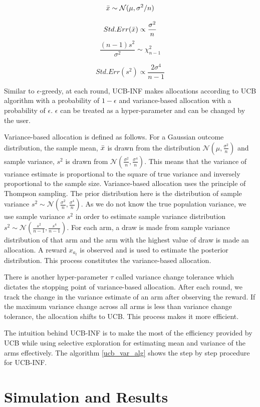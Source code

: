 \documentclass[12pt, letterpaper]{article}
\begin{document}
$$ \Bar{x} \sim \mathcal{N} (\mu, \sigma^2/n) $$

$$ Std.Err(\Bar{x}) \propto \frac{\sigma^2}{n}$$
$$ \frac{(n-1)s^2}{\sigma^2} \sim \chi_{n-1} ^2 $$

$$ Std.Err(s^2)  \propto  \frac{2\sigma^4}{n-1}$$


Similar to $\epsilon$-greedy, at each round, UCB-INF makes allocations according to UCB algorithm with a probability of $1-\epsilon$ and variance-based allocation with a probability of $\epsilon$. $\epsilon$ can be treated as a hyper-parameter and can be changed by the user.

Variance-based allocation is defined as follows. For a Gaussian outcome distribution, the sample mean, $\Bar{x}$ is drawn from the distribution $\mathcal{N}(\mu, \frac{\sigma^2}{n})$ and sample variance, $s^2$ is drawn from $\mathcal{N}( \frac{\sigma^2}{n}, \frac{\sigma^4}{n})$. This means that the variance of variance estimate is proportional to the square of true variance and inversely proportional to the sample size. Variance-based allocation uses the principle of Thompson sampling. The prior distribution here is the distribution of sample variance $s^2 \sim \mathcal{N}( \frac{\sigma^2}{n}, \frac{\sigma^4}{n})$. As we do not know the true population variance, we use sample variance $s^2$ in order to estimate sample variance distribution $s^2 \sim \mathcal{N}( \frac{s^2}{n-1}, \frac{s^4}{n-1})$. For each arm, a draw is made from sample variance distribution of that arm and the arm with the highest value of draw is made an allocation. A reward $x_{a_t}$ is observed and is used to estimate the posterior distribution. This process constitutes the variance-based allocation.

There is another hyper-parameter $\tau$ called variance change tolerance which dictates the stopping point of variance-based allocation. After each round, we track the change in the variance estimate of an arm after observing the reward. If the maximum variance change across all arms is less than variance change tolerance, the allocation shifts to UCB. This process makes it more efficient. 

The intuition behind UCB-INF is to make the most of the efficiency provided by UCB while using selective exploration for estimating mean and variance of the arms effectively. The algorithm \ref{ucb_var_alg} shows the step by step procedure for UCB-INF.


\section*{Simulation and Results}
\end{document}
